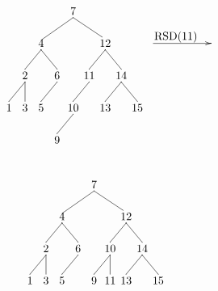 \documentclass[10pt,a4paper,spanish]{report}
\begin{document}
\begin{minipage}{0.5\textwidth}
\[\begin{xy}
,(32,-8)*+=<20mm>[]\txt<2cm>{RSD(11)}
,(0,0)*+=<10mm>[]\txt<2cm>{7}
,(-10,-10)*+=<10mm>[]\txt<2cm>{4}
,(10,-10)*+=<10mm>[]\txt<2cm>{12}
,(-15,-20)*+=<10mm>[]\txt<2cm>{2}
,(-5,-20)*+=<10mm>[]\txt<2cm>{6}
,(5,-20)*+=<10mm>[]\txt<2cm>{11}
,(15,-20)*+=<10mm>[]\txt<2cm>{14}
,(-20,-30)*+=<10mm>[]\txt<2cm>{1}
,(-15,-30)*+=<10mm>[]\txt<2cm>{3}
,(-10,-30)*+=<10mm>[]\txt<2cm>{5}
,(0,-30)*+=<10mm>[]\txt<2cm>{10}
,(10,-30)*+=<10mm>[]\txt<2cm>{13}
,(20,-30)*+=<10mm>[]\txt<2cm>{15}
,(-5,-40)*+=<10mm>[]\txt<2cm>{9}

\ar@{->} (25,-10);(43,-10)
\ar@{-} (0,-2);(-10,-9) %
\ar@{-} (0,-2);(9,-8) %
\ar@{-} (-10,-12);(-15,-18) %
\ar@{-} (10,-12);(5,-18) %
\ar@{-} (10,-12);(15,-18) %
\ar@{-} (-15,-22);(-20,-28)
\ar@{-} (-15,-22);(-15,-28)
\ar@{-} (-10,-12);(-5,-18) %
\ar@{-} (-5,-22);(-10,-28) %
\ar@{-} (5,-22);(0,-28)
\ar@{-} (0,-32);(-5,-38)
\ar@{-} (15,-22);(10,-28)
\ar@{-} (15,-22);(20,-28)
\end{xy}\]
\end{minipage}
\begin{minipage}{0.5\textwidth}
\[\begin{xy}
,(0,0)*+=<10mm>[]\txt<2cm>{7}
,(-10,-10)*+=<10mm>[]\txt<2cm>{4}
,(10,-10)*+=<10mm>[]\txt<2cm>{12}
,(-15,-20)*+=<10mm>[]\txt<2cm>{2}
,(-5,-20)*+=<10mm>[]\txt<2cm>{6}
,(5,-20)*+=<10mm>[]\txt<2cm>{10}
,(15,-20)*+=<10mm>[]\txt<2cm>{14}
,(-20,-30)*+=<10mm>[]\txt<2cm>{1}
,(-15,-30)*+=<10mm>[]\txt<2cm>{3}
,(-10,-30)*+=<10mm>[]\txt<2cm>{5}
,(0,-30)*+=<10mm>[]\txt<2cm>{9}
,(10,-30)*+=<10mm>[]\txt<2cm>{13}
,(20,-30)*+=<10mm>[]\txt<2cm>{15}
,(5,-30)*+=<10mm>[]\txt<2cm>{11}

\ar@{-} (0,-2);(-10,-9) %
\ar@{-} (0,-2);(9,-8) %
\ar@{-} (-10,-12);(-15,-18) %
\ar@{-} (10,-12);(5,-18) %
\ar@{-} (10,-12);(15,-18) %
\ar@{-} (-15,-22);(-20,-28)
\ar@{-} (-15,-22);(-15,-28)
\ar@{-} (-10,-12);(-5,-18) %
\ar@{-} (-5,-22);(-10,-28) %
\ar@{-} (5,-22);(0,-28)
\ar@{-} (15,-22);(10,-28)
\ar@{-} (15,-22);(20,-28)
\ar@{-} (5,-22);(5,-28) %
\end{xy}\]
\end{minipage}
\end{document}
